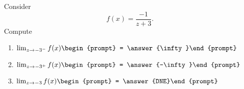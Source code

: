 \documentclass{ximera}
\author{Bart Snapp}
\begin{document}
\begin{exercise}
Consider 
\[
f(x) = \frac{-1}{z+3}.
\]
Compute
\begin{enumerate}
\item $\lim_{z\to -3^- } f(x) \begin{prompt} = \answer{\infty}\end{prompt}$
\item $\lim_{z\to -3^+ } f(x) \begin{prompt} = \answer{-\infty}\end{prompt}$
\item $\lim_{z\to -3 } f(x) \begin{prompt} = \answer{DNE}\end{prompt}$
\end{enumerate}
\end{exercise}
\end{document}
